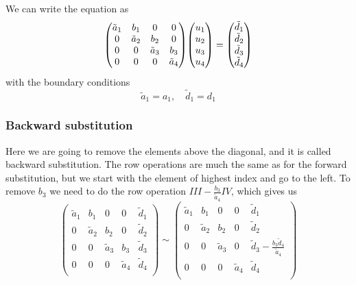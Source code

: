 \documentclass{scrartcl}
\begin{document}
We can write the equation as
$$\mqty(\tilde{a}_1 & b_1 & 0 & 0 \\
		0 & \tilde{a}_2 & b_2 & 0 \\
		0 & 0 & \tilde{a}_3 & b_3 \\
		0 & 0 & 0 & \tilde{a}_4)
  \mqty(u_1 \\ u_2 \\ u_3 \\ u_4)=
  \mqty(\tilde{d}_1 \\ \tilde{d}_2 \\ 
  		\tilde{d}_3 \\ \tilde{d}_4)$$
with the boundary conditions 
\begin{equation*}
\tilde{a}_1=a_1,\quad \tilde{d}_1=d_1 
\end{equation*}

\subsubsection{Backward substitution}
Here we are going to remove the elements above the diagonal, and it is called backward substitution. The row operations are much the same as for the forward substitution, but we start with the element of highest index and go to the left. To remove $b_3$ we need to do the row operation $III-\frac{b_3}{\tilde{a}_4}IV$, which gives us
\[
 \left(
  \begin{array}{cccc|c}
   \tilde{a}_1 & b_1 & 0 & 0 & \tilde{d}_1 \\
   0 & \tilde{a}_2 & b_2 & 0 & \tilde{d}_2 \\
   0 & 0 & \tilde{a}_3 & b_3 & \tilde{d}_3 \\
   0 & 0 & 0 & \tilde{a}_4 & \tilde{d}_4 \\
  \end{array}
 \right)\sim
 \left(
  \begin{array}{cccc|c}
   \tilde{a}_1 & b_1 & 0 & 0 & \tilde{d}_1 \\
   0 & \tilde{a}_2 & b_2 & 0 & \tilde{d}_2 \\
   0 & 0 & \tilde{a}_3 & 0 & \tilde{d}_3-\frac{b_3\tilde{d}_4}{\tilde{a}_4} \\
   0 & 0 & 0 & \tilde{a}_4 & \tilde{d}_4 \\
  \end{array}
 \right)
\]
 
\end{document}
